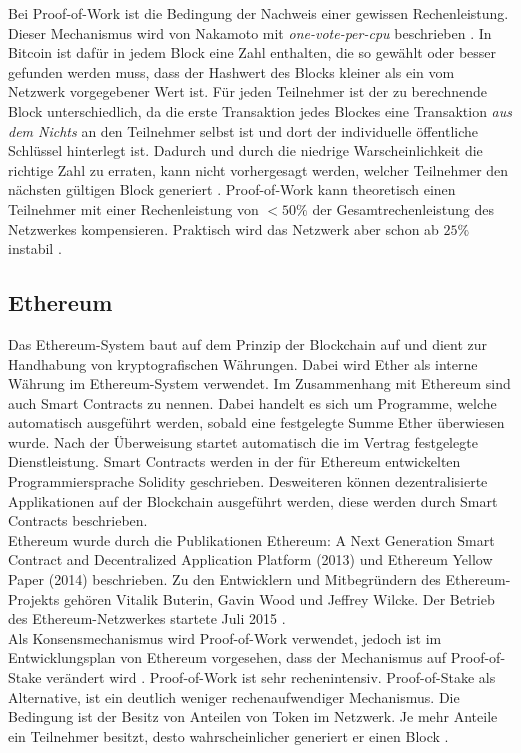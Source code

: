 		Bei Proof-of-Work ist die Bedingung der Nachweis einer gewissen Rechenleistung. Dieser Mechanismus wird von Nakamoto mit \textit{one-vote-per-cpu} beschrieben \citep{PoW, BC}.
		In Bitcoin ist dafür in jedem Block eine Zahl enthalten, die so gewählt oder besser gefunden werden muss, dass der Hashwert des Blocks kleiner als ein vom Netzwerk vorgegebener Wert ist. Für jeden Teilnehmer ist der zu berechnende Block unterschiedlich, da die erste Transaktion jedes Blockes eine Transaktion \textit{aus dem Nichts} an den Teilnehmer selbst ist und dort der individuelle öffentliche Schlüssel hinterlegt ist. Dadurch und durch die niedrige Warscheinlichkeit die richtige Zahl zu erraten, kann nicht vorhergesagt werden, welcher Teilnehmer den nächsten gültigen Block generiert \citep{PoW}.
		Proof-of-Work kann theoretisch einen Teilnehmer mit einer Rechenleistung von \(<50\%\) der Gesamtrechenleistung des Netzwerkes kompensieren. Praktisch wird das Netzwerk aber schon ab \(25\%\) instabil \citep{CC}.
		
	\subsection{Ethereum}
	
		Das Ethereum-System baut auf dem Prinzip der Blockchain auf und dient zur Handhabung von kryptografischen Währungen. Dabei wird Ether als interne Währung im Ethereum-System verwendet. Im Zusammenhang mit Ethereum sind auch Smart Contracts zu nennen. Dabei handelt es sich um Programme, welche automatisch ausgeführt werden, sobald eine festgelegte Summe Ether überwiesen wurde. Nach der Überweisung startet automatisch die im Vertrag festgelegte Dienstleistung. Smart Contracts werden in der für Ethereum entwickelten Programmiersprache Solidity geschrieben. Desweiteren können dezentralisierte Applikationen auf der Blockchain ausgeführt werden, diese werden durch Smart Contracts beschrieben. \\
		Ethereum wurde durch die Publikationen Ethereum: A Next Generation Smart Contract and Decentralized Application Platform (2013) \citep{ETHW} und Ethereum Yellow Paper (2014) \citep{ETHY} beschrieben. Zu den Entwicklern und Mitbegründern des Ethereum-Projekts gehören Vitalik Buterin, Gavin Wood und Jeffrey Wilcke. Der Betrieb des Ethereum-Netzwerkes startete Juli 2015 \citep{ETHT}. \\
		Als Konsensmechanismus wird Proof-of-Work verwendet, jedoch ist im Entwicklungsplan von Ethereum vorgesehen, dass der Mechanismus auf Proof-of-Stake verändert wird \citep{ETHE}. Proof-of-Work ist sehr rechenintensiv. Proof-of-Stake als Alternative, ist ein deutlich weniger rechenaufwendiger Mechanismus. Die Bedingung ist der Besitz von Anteilen von Token im Netzwerk. Je mehr Anteile ein Teilnehmer besitzt, desto wahrscheinlicher generiert er einen Block \citep{BITB}.
		
